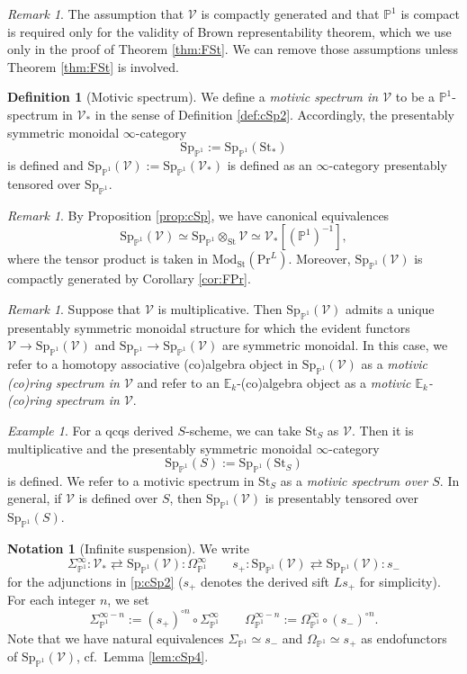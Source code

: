 \documentclass{amsart}
\theoremstyle{plain}
\theoremstyle{definition}
\newtheorem{definition}[theorem]{Definition}
\newtheorem{notation}[theorem]{Notation}
\theoremstyle{remark}
\newtheorem{remark}[theorem]{Remark}
\newtheorem{example}[theorem]{Example}
\numberwithin{equation}{theorem}
\newcommand{\mbb}[1]{\mathbb{#1}}
\newcommand{\Mod}{\mathrm{Mod}}
\renewcommand{\Pr}{\mathrm{Pr}}
\newcommand{\St}{\mathrm{St}}
\newcommand{\V}{\mathcal{V}}
\newcommand{\OmegaP}{\Omega_{\mathbb{P}^1}}
\newcommand{\SigmaP}{\Sigma_{\mathbb{P}^1}}
\newcommand{\SpP}{\mathrm{Sp}_{\mathbb{P}^1}}
\begin{document}
\begin{remark}
The assumption that $\V$ is compactly generated and that $\mbb{P}^1$ is compact is required only for the validity of Brown representability theorem, which we use only in the proof of Theorem \ref{thm:FSt}.
We can remove those assumptions unless Theorem \ref{thm:FSt} is involved.
\end{remark}

\begin{definition}[Motivic spectrum]\label{def:DMS}
We define a \textit{motivic spectrum in $\V$} to be a $\mbb{P}^1$-spectrum in $\V_*$ in the sense of Definition \ref{def:cSp2}.
Accordingly, the presentably symmetric monoidal $\infty$-category
\[
	\SpP := \SpP(\St_*)
\]
is defined and $\SpP(\V):=\SpP(\V_*)$ is defined as an $\infty$-category presentably tensored over $\SpP$.
\end{definition}

\begin{remark}
By Proposition \ref{prop:cSp}, we have canonical equivalences
\[
	\SpP(\V) \simeq \SpP\otimes_\St\V \simeq \V_*[(\mbb{P}^1)^{-1}],
\]
where the tensor product is taken in $\Mod_\St(\Pr^L)$.
Moreover, $\SpP(\V)$ is compactly generated by Corollary \ref{cor:FPr}.
\end{remark}

\begin{remark}
Suppose that $\V$ is multiplicative.
Then $\SpP(\V)$ admits a unique presentably symmetric monoidal structure for which the evident functors $\V\to\SpP(\V)$ and $\SpP\to\SpP(\V)$ are symmetric monoidal.
In this case, we refer to a homotopy associative (co)algebra object in $\SpP(\V)$ as a \textit{motivic (co)ring spectrum in $\V$} and refer to an $\mbb{E}_k$-(co)algebra object as a \textit{motivic $\mbb{E}_k$-(co)ring spectrum in $\V$}.
\end{remark}

\begin{example}
For a qcqs derived $S$-scheme, we can take $\St_S$ as $\V$.
Then it is multiplicative and the presentably symmetric monoidal $\infty$-category
\[
	\SpP(S) := \SpP(\St_S)
\]
is defined.
We refer to a motivic spectrum in $\St_S$ as a \textit{motivic spectrum over $S$}.
In general, if $\V$ is defined over $S$, then $\SpP(\V)$ is presentably tensored over $\SpP(S)$.
\end{example}

\begin{notation}[Infinite suspension]
We write
\[
	\SigmaP^\infty \colon \V_* \rightleftarrows \SpP(\V) \colon \OmegaP^\infty \qquad
	s_+ \colon \SpP(\V) \rightleftarrows \SpP(\V) \colon s_-
\]
for the adjunctions in \ref{p:cSp2} ($s_+$ denotes the derived sift $Ls_+$ for simplicity).
For each integer $n$, we set
\[
	\SigmaP^{\infty-n} := (s_+)^{\circ n}\circ\SigmaP^\infty \qquad
	\OmegaP^{\infty-n} := \OmegaP^\infty\circ (s_-)^{\circ n}.
\]
Note that we have natural equivalences $\SigmaP\simeq s_-$ and $\OmegaP \simeq s_+$ as endofunctors of $\SpP(\V)$, cf.\ Lemma \ref{lem:cSp4}.
\end{notation}
\end{document}
